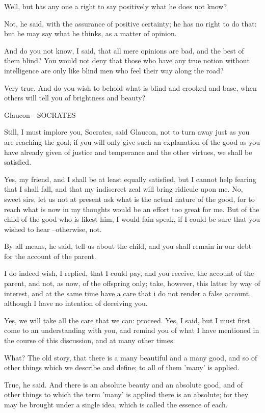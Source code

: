 Well, but has any one a right to say positively what he does not know?

Not, he said, with the assurance of positive certainty; he has no right to do that: but he may say what he thinks, as a matter of opinion.

And do you not know, I said, that all mere opinions are bad, and the best of them blind? You would not deny that those who have any true notion without intelligence are only like blind men who feel their way along the road?

Very true.
And do you wish to behold what is blind and crooked and base, when others will tell you of brightness and beauty?

Glaucon - SOCRATES

Still, I must implore you, Socrates, said Glaucon, not to turn away just as you are reaching the goal; if you will only give such an explanation of the good as you have already given of justice and temperance and the other virtues, we shall be satisfied.

Yes, my friend, and I shall be at least equally satisfied, but I cannot help fearing that I shall fall, and that my indiscreet zeal will bring ridicule upon me. No, sweet sirs, let us not at present ask what is the actual nature of the good, for to reach what is now in my thoughts would be an effort too great for me. But of the child of the good who is likest him, I would fain speak, if I could be sure that you wished to hear --otherwise, not.

By all means, he said, tell us about the child, and you shall remain in our debt for the account of the parent.

I do indeed wish, I replied, that I could pay, and you receive, the account of the parent, and not, as now, of the offspring only; take, however, this latter by way of interest, and at the same time have a care that i do not render a false account, although I have no intention of deceiving you.

Yes, we will take all the care that we can: proceed.
Yes, I said, but I must first come to an understanding with you, and remind you of what I have mentioned in the course of this discussion, and at many other times.

What?
The old story, that there is a many beautiful and a many good, and so of other things which we describe and define; to all of them 'many' is applied.

True, he said.
And there is an absolute beauty and an absolute good, and of other things to which the term 'many' is applied there is an absolute; for they may be brought under a single idea, which is called the essence of each.

